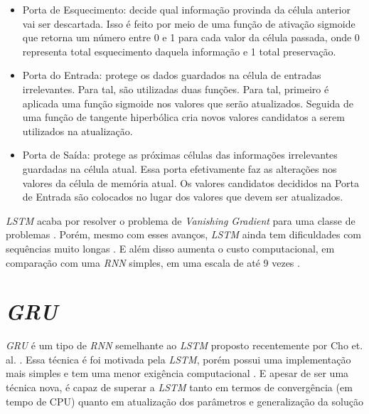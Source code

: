 \begin{itemize}
  \item Porta de Esquecimento: decide qual informação provinda da célula anterior vai ser descartada. Isso é feito por meio de uma função de ativação sigmoide que retorna um número entre 0 e 1 para cada valor da célula passada, onde 0 representa total esquecimento daquela informação e 1 total preservação.
  
  \item Porta do Entrada: protege os dados guardados na célula de entradas irrelevantes. Para tal, são utilizadas duas funções. Para tal, primeiro é aplicada uma função sigmoide nos valores que serão atualizados. Seguida de uma função de tangente hiperbólica cria novos valores candidatos a serem utilizados na atualização.
  
  \item Porta de Saída: protege as próximas células das informações irrelevantes guardadas na célula atual. Essa porta efetivamente faz as alterações nos valores da célula de memória atual. Os valores candidatos decididos na Porta de Entrada são colocados no lugar dos valores que devem ser atualizados.
\end{itemize}

\textit{\acrshort{LSTM}} acaba por resolver o problema de \textit{Vanishing Gradient} para uma classe de problemas \cite{doi:10.1162/neco.1997.9.8.1735}. Porém, mesmo com esses avanços, \textit{\acrshort{LSTM}} ainda tem dificuldades com sequências muito longas \cite{alex2012}. E além disso aumenta o custo computacional, em comparação com uma \textit{\acrshort{RNN}} simples, em uma escala de até 9 vezes \cite{doi:10.1162/neco.1997.9.8.1735}.

\section{\textit{\acrfull{GRU}}}

\textit{\acrshort{GRU}} é um tipo de \textit{\acrshort{RNN}} semelhante ao \textit{\acrshort{LSTM}} proposto recentemente por Cho et. al. \cite{cho2014}. Essa técnica é foi motivada pela \textit{\acrshort{LSTM}}, porém possui uma implementação mais simples e tem uma menor exigência computacional \cite{cho2014}. E apesar de ser uma técnica nova, é capaz de superar a \textit{\acrshort{LSTM}} tanto em termos de convergência (em tempo de CPU) quanto em atualização dos parâmetros e generalização da solução \cite{chung2014empirical}

